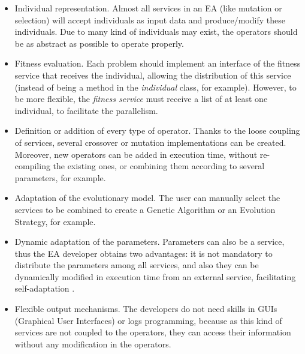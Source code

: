 \begin{itemize}
\item Individual representation. Almost all services in an EA (like mutation or selection) will accept individuals as input data and produce/modify these individuals. Due to many kind of individuals may exist, the operators should be as abstract as possible to operate properly.
\item Fitness evaluation. Each problem should implement an interface of the fitness service that receives the individual, allowing the distribution of this service (instead of being a method in the {\em individual} class, for example). However, to be more flexible, the {\em fitness service} must receive a list of at least one individual, to facilitate the parallelism.
\item Definition or addition of every type of operator. Thanks to the loose coupling of services, several crossover or mutation implementations can be created. Moreover, new operators can be added in execution time, without re-compiling the existing ones, or combining them according to several parameters, for example.
\item Adaptation of the evolutionary model. The user can manually select the services to be combined to create a Genetic Algorithm or an Evolution Strategy, for example.
\item Dynamic adaptation of the parameters. Parameters can also be a service, thus the EA developer obtains two advantages: it is not mandatory to distribute the parameters among all services, and also they can be dynamically modified in execution time from an external service, facilitating self-adaptation \cite{eiben2005shared}.
\item Flexible output mechanisms. The developers do not need skills in GUIs (Graphical User Interfaces) or logs programming, because as this kind of services are not coupled to the operators, they can access their information without any modification in the operators.
\end{itemize}






